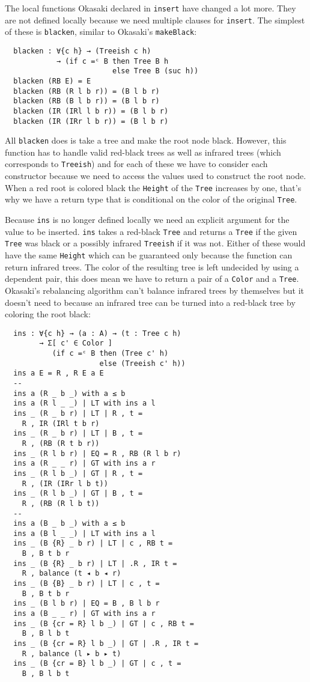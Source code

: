 \documentclass[journal, retainorgcmds]{IEEEtran}
\newcommand{\iagda}[1]{\texttt{#1}}
\newcommand{\ihask}[1]{\texttt{#1}}
\begin{document}
The local functions Okasaki declared in \ihask{insert} have changed a lot more.
They are not defined locally because we need multiple clauses for
\iagda{insert}.
The simplest of these is \iagda{blacken}, similar to Okasaki's
\ihask{makeBlack}:

\begin{verbatim}
  blacken : ∀{c h} → (Treeish c h)
            → (if c =ᶜ B then Tree B h
                         else Tree B (suc h))
  blacken (RB E) = E
  blacken (RB (R l b r)) = (B l b r)
  blacken (RB (B l b r)) = (B l b r)
  blacken (IR (IRl l b r)) = (B l b r)
  blacken (IR (IRr l b r)) = (B l b r)
\end{verbatim}

All \iagda{blacken} does is take a tree and make the root node black.
However, this function has to handle valid red-black trees as well as infrared
trees (which corresponds to \iagda{Treeish}) and for each of these we have to
consider each constructor because we need to access the values used to
construct the root node.
When a red root is colored black the \iagda{Height} of the \iagda{Tree}
increases by one, that's why we have a return type that is conditional on the
color of the original \iagda{Tree}.

Because \iagda{ins} is no longer defined locally we need an explicit argument
for the value to be inserted.
\iagda{ins} takes a red-black \iagda{Tree} and returns a \iagda{Tree} if the
given \iagda{Tree} was black or a possibly infrared \iagda{Treeish} if it was
not.
Either of these would have the same \iagda{Height} which can be guaranteed only
because the function can return infrared trees.
The color of the resulting tree is left undecided by using a dependent pair,
this does mean we have to return a pair of a \iagda{Color} and a \iagda{Tree}.
Okasaki's rebalancing algorithm can't balance infrared trees by themselves but
it doesn't need to because an infrared tree can be turned into a red-black tree
by coloring the root black:

\begin{verbatim}
  ins : ∀{c h} → (a : A) → (t : Tree c h)
        → Σ[ c' ∈ Color ]
           (if c =ᶜ B then (Tree c' h)
                      else (Treeish c' h))
  ins a E = R , R E a E
  --
  ins a (R _ b _) with a ≤ b
  ins a (R l _ _) | LT with ins a l
  ins _ (R _ b r) | LT | R , t =
    R , IR (IRl t b r)
  ins _ (R _ b r) | LT | B , t =
    R , (RB (R t b r))
  ins _ (R l b r) | EQ = R , RB (R l b r)
  ins a (R _ _ r) | GT with ins a r
  ins _ (R l b _) | GT | R , t =
    R , (IR (IRr l b t))
  ins _ (R l b _) | GT | B , t =
    R , (RB (R l b t))
  --
  ins a (B _ b _) with a ≤ b
  ins a (B l _ _) | LT with ins a l
  ins _ (B {R} _ b r) | LT | c , RB t =
    B , B t b r
  ins _ (B {R} _ b r) | LT | .R , IR t =
    R , balance (t ◂ b ◂ r)
  ins _ (B {B} _ b r) | LT | c , t =
    B , B t b r
  ins _ (B l b r) | EQ = B , B l b r
  ins a (B _ _ r) | GT with ins a r
  ins _ (B {cr = R} l b _) | GT | c , RB t =
    B , B l b t
  ins _ (B {cr = R} l b _) | GT | .R , IR t =
    R , balance (l ▸ b ▸ t)
  ins _ (B {cr = B} l b _) | GT | c , t =
    B , B l b t
\end{verbatim}
\end{document}

